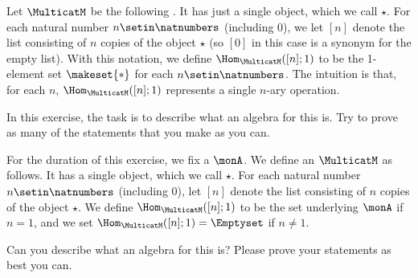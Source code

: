 

\begin{gradedexercise}
    \label{ex:MonoidsAsAlgebras}
    Let $\MulticatM$ be the following .
    It has just a single object, which we call $\star$.
    For each natural number $n \setin \natnumbers$ (including $0$), we let $[n]$ denote the list consisting of $n$ copies of the object $\star$ (so $[0]$ in this case is a synonym for the empty list).
    With this notation, we define $\Hom_\MulticatM([n];1)$ to be the 1-element set $\makeset{ * }$ for each $n \setin \natnumbers$.
    The intuition is that, for each $n$, $\Hom_\MulticatM([n];1)$ represents a single $n$-ary operation.

    In this exercise, the task is to describe what an algebra for this  is.
    Try to prove as many of the statements that you make as you can.
\end{gradedexercise}



\begin{gradedexercise}
    \label{ex:MonoidsActionsAsAlgebras}
    For the duration of this exercise, we fix a  $\monA$.
    We define an $\MulticatM$ as follows.
    It has a single object, which we call $\star$.
    For each natural number $n \setin \natnumbers$ (including $0$), let $[n]$ denote the list consisting of $n$ copies of the object $\star$.
    We define $\Hom_\MulticatM([n];1)$ to be the set underlying $\monA$ if $n =1$, and we set $\Hom_\MulticatM([n];1) = \Emptyset$ if $n \neq 1$.

    Can you describe what an algebra for this  is?
    Please prove your statements as best you can.
\end{gradedexercise}



